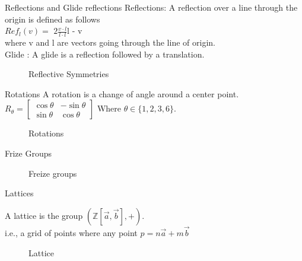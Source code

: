 \documentclass{beamer}
\begin{document}
\begin{frame}{Reflections and Glide reflections}
        Reflections: A reflection over a line through the origin is defined as follows\\
        $Ref_l(v) =$ \(2\frac{v \cdot l}{l \cdot l}\)l - v\\ where v and l are vectors going through the line of origin.\\ 
        Glide : A glide is a reflection followed by a translation.  \cite{Angela:2023}
    \begin{figure}
        \centering
        
        \caption{Reflective Symmetries}
        \label{fig:symmetries}
    \end{figure}
\end{frame}

\begin{frame}{Rotations}
        A rotation is a change of angle around a center point.
        $R_\theta = \begin{bmatrix}
            \cos\theta & -\sin\theta\\
            \sin\theta & \cos\theta
        \end{bmatrix}$ 
        Where $\theta \in \{1,2,3,6\}.$ \cite{Angela:2023}
    \begin{figure}
        \centering
        
        \caption{Rotations}
        \label{fig:enter-label}
    \end{figure}
\end{frame}

\begin{frame}{Frize Groups}
    \begin{figure}
        \centering
        
        \caption{Freize groups}
        \label{fig:Freize}
    \end{figure}
\end{frame}

\begin{frame}{Lattices}
    \begin{definition}
        A lattice is the group $(\mathbb{Z}[\Vec{a},\Vec{b}],+).$\\
        i.e., a grid of points where any point $p = n\Vec{a} +m\Vec{b}$ 
    \end{definition}
    \begin{figure}
        \centering
        \scalebox{0.5}{}
        \caption{Lattice}
        \label{fig:enter-label}
    \end{figure}
\end{frame}
\end{document}
